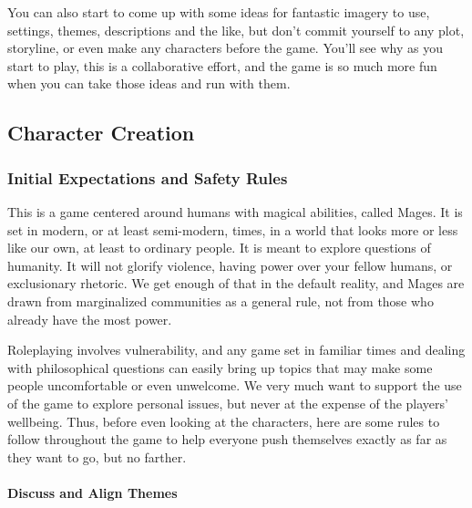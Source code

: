 \documentclass[
]{article}
\begin{document}
You can also start to come up with some ideas for fantastic imagery to
use, settings, themes, descriptions and the like, but don't commit
yourself to any plot, storyline, or even make any characters before the
game. You'll see why as you start to play, this is a collaborative
effort, and the game is so much more fun when you can take those ideas
and run with them.

\hypertarget{character-creation}{%
\subsection{Character Creation}\label{character-creation}}

\label{Safety Rules}

\hypertarget{initial-expectations-and-safety-rules}{%
\subsubsection{Initial Expectations and Safety
Rules}\label{initial-expectations-and-safety-rules}}

This is a game centered around humans with magical abilities, called
Mages. It is set in modern, or at least semi-modern, times, in a world
that looks more or less like our own, at least to ordinary people. It is
meant to explore questions of humanity. It will not glorify violence,
having power over your fellow humans, or exclusionary rhetoric. We get
enough of that in the default reality, and Mages are drawn from
marginalized communities as a general rule, not from those who already
have the most power.

Roleplaying involves vulnerability, and any game set in familiar times
and dealing with philosophical questions can easily bring up topics that
may make some people uncomfortable or even unwelcome. We very much want
to support the use of the game to explore personal issues, but never at
the expense of the players' wellbeing. Thus, before even looking at the
characters, here are some rules to follow throughout the game to help
everyone push themselves exactly as far as they want to go, but no
farther.

\hypertarget{discuss-and-align-themes}{%
\paragraph{Discuss and Align Themes}\label{discuss-and-align-themes}}
\end{document}
